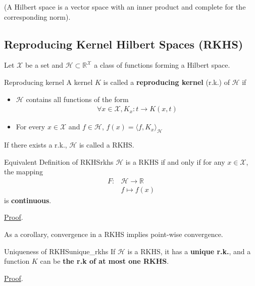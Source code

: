 \documentclass{article}
\begin{document}
(A Hilbert space is a vector space with an inner product and complete for the 
corresponding norm).

\subsection{Reproducing Kernel Hilbert Spaces (RKHS)}

Let $\mathcal{X}$ be a set and $\mathcal{H} \subset \mathbb{R}^\mathcal{X}$ a 
class of functions forming a Hilbert space. 
\begin{Definition}{Reproducing kernel}{}
    A kernel $K$ is called a \textbf{reproducing kernel} (r.k.) of $\mathcal{H}$ 
    if 
    \begin{itemize}
        \item $\mathcal{H}$ contains all functions of the form 
        \begin{align*}
           \boxed{\forall x \in \mathcal{X}, K_x: t \rightarrow K(x, t)}
        \end{align*}
        \item For every $x \in \mathcal{X}$ and $f\in \mathcal{H}$, 
        $\boxed{f(x) = \langle f, K_x \rangle_\mathcal{H} }$
    \end{itemize}
\end{Definition}

If there exists a r.k., $\mathcal{H}$ is called a RKHS.

\begin{Theorem}{Equivalent Definition of RKHS}{rkhs}
    $\mathcal{H}$ is a RKHS if and only if for any $x\in\mathcal{X}$, the 
    mapping
    \begin{align*}
        F: & \mathcal{H}\rightarrow \mathbb{R}\\
        & f \mapsto f(x)
    \end{align*}
    is \textbf{continuous}.
    \par \hfill \hyperref[prf:rkhs]{\small Proof}.
\end{Theorem}


As a corollary, convergence in a RKHS implies point-wise convergence.


\begin{Theorem}{Uniqueness of RKHS}{unique_rkhs}
  If $\mathcal{H}$ is a RKHS, it has a \textbf{unique r.k.}, and a function $K$
  can be \textbf{the r.k of at most one RKHS}.
  \par \hfill \hyperref[prf:unique_rkhs]{\small Proof}.
\end{Theorem}
\end{document}
